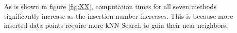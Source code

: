 As is shown in figure \ref{fig:XX}, computation times for all seven methods significantly increase as the insertion  number increases. This is because more inserted data points require more kNN Search to gain their near neighbors.

